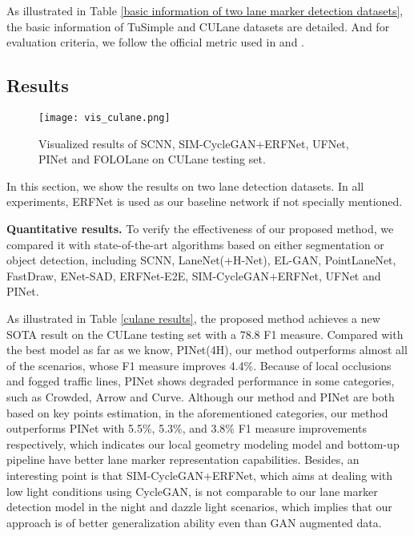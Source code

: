 \documentclass[final]{cvpr}
\begin{document}
As illustrated in Table \ref{basic information of two lane marker detection datasets}, the basic information of TuSimple and CULane datasets are detailed. And for evaluation criteria, we follow the official metric used in \cite{tusimple} and \cite{pan2017spatial}.

\thispagestyle{empty}
\subsection{Results}

\begin{figure*}[htbp]
	\begin{center}
		\texttt{[image: vis\_culane.png]}
	\end{center}
	\caption{Visualized results of SCNN, SIM-CycleGAN+ERFNet, UFNet, PINet and FOLOLane on CULane testing set.}
	\label{fig:qualitative results}
\end{figure*}


In this section, we show the results on two lane detection datasets. In all experiments, ERFNet\cite{romera2017erfnet} is used as our baseline network if not specially mentioned.

\textbf{Quantitative results.} To verify the effectiveness of our proposed method, we compared it with state-of-the-art algorithms based on either segmentation or object detection, including SCNN\cite{pan2017spatial}, LaneNet(+H-Net)\cite{neven2018towards}, EL-GAN\cite{ghafoorian2018gan},  PointLaneNet\cite{chen2019pointlanenet}, FastDraw\cite{philion2019fastdraw}, ENet-SAD\cite{hou2019learning}, ERFNet-E2E\cite{yoo2020end}, SIM-CycleGAN+ERFNet\cite{liu2020lane}, UFNet\cite{qin2020ultra} and PINet\cite{ko2020key}.

As illustrated in Table \ref{culane results}, the proposed method achieves a new SOTA result on the CULane testing set with a 78.8 F1 measure. Compared with the best model as far as we know, PINet(4H), our method outperforms almost all of the scenarios, whose F1 measure improves 4.4\%. Because of local occlusions and fogged traffic lines, PINet shows degraded performance in some categories, such as Crowded, Arrow and Curve. Although our method and PINet are both based on key points estimation, in the aforementioned categories, our method outperforms PINet with 5.5\%, 5.3\%, and 3.8\% F1 measure improvements respectively, which indicates our local geometry modeling model and bottom-up pipeline have better lane marker representation capabilities. Besides, an interesting point is that SIM-CycleGAN+ERFNet, which aims at dealing with low light conditions using CycleGAN, is not comparable to our lane marker detection model in the night and dazzle light scenarios, which implies that our approach is of better generalization ability even than GAN augmented data.
\end{document}

